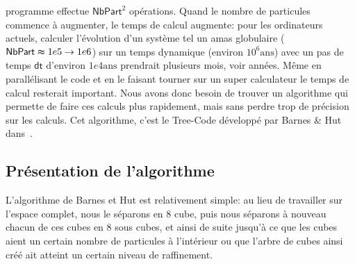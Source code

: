 programme effectue $\mathsf{NbPart}^2$ opérations. Quand le nombre de particules commence à augmenter, le temps de
calcul augmente: pour les ordinateurs actuels, calculer l'évolution d'un système tel un amas globulaire
($\mathsf{NbPart} \thickapprox 1e5 \to 1e6$) sur un temps dynamique (environ $10^6 \mathrm{ans}$) avec un pas de temps
$\mathsf{dt}$ d'environ $1e4 \mathrm{ans}$ prendrait plusieurs mois, voir années. Même en parallélisant le code  et en
le faisant tourner sur un super calculateur le temps de calcul resterait important. Nous avons donc besoin de trouver un
algorithme qui permette de faire ces calculs plus rapidement, mais sans perdre trop de précision sur les calculs. Cet
algorithme, c'est le Tree-Code développé par Barnes \& Hut dans~\cite{1986Natur.324..446B}.

\subsection{Présentation de l'algorithme}
	L'algorithme de Barnes et Hut est relativement simple: au lieu de travailler sur l'espace complet, nous le
séparons en $8$ cube, puis nous séparons à nouveau chacun de ces cubes en $8$ sous cubes, et ainsi de suite jusqu'à ce
que les cubes aient un certain nombre de particules à l'intérieur ou que l'arbre de cubes ainsi créé ait atteint un
certain niveau de raffinement.

	\begin{figure}[h]
		\begin{center}
			
		\end{center}
	\end{figure}
